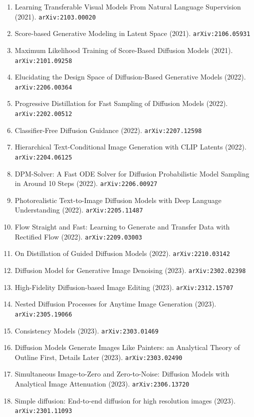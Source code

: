 \documentclass[11pt]{article}
\begin{document}
\begin{enumerate}
  Text-Guided Diffusion Models (2021). \texttt{arXiv:2112.10741}
  \item Learning Transferable Visual Models From Natural Language Supervision (2021). \texttt{arXiv:2103.00020}
  \item Score-based Generative Modeling in Latent Space (2021). \texttt{arXiv:2106.05931}
  \item Maximum Likelihood Training of Score-Based Diffusion Models (2021). \texttt{arXiv:2101.09258}
  \item Elucidating the Design Space of Diffusion-Based Generative Models (2022). \texttt{arXiv:2206.00364}
  \item Progressive Distillation for Fast Sampling of Diffusion Models (2022). \texttt{arXiv:2202.00512}
  \item Classifier-Free Diffusion Guidance (2022). \texttt{arXiv:2207.12598}
  \item Hierarchical Text-Conditional Image Generation with CLIP Latents (2022). \texttt{arXiv:2204.06125}
  \item DPM-Solver: A Fast ODE Solver for Diffusion Probabilistic Model Sampling
  in Around 10 Steps (2022). \texttt{arXiv:2206.00927}
  \item Photorealistic Text-to-Image Diffusion Models with Deep Language
  Understanding (2022). \texttt{arXiv:2205.11487}
  \item Flow Straight and Fast: Learning to Generate and Transfer Data with
  Rectified Flow (2022). \texttt{arXiv:2209.03003}
  \item On Distillation of Guided Diffusion Models (2022). \texttt{arXiv:2210.03142}
  \item Diffusion Model for Generative Image Denoising (2023). \texttt{arXiv:2302.02398}
  \item High-Fidelity Diffusion-based Image Editing (2023). \texttt{arXiv:2312.15707}
  \item Nested Diffusion Processes for Anytime Image Generation (2023). \texttt{arXiv:2305.19066}
  \item Consistency Models (2023). \texttt{arXiv:2303.01469}
  \item Diffusion Models Generate Images Like Painters: an Analytical Theory of
  Outline First, Details Later (2023). \texttt{arXiv:2303.02490}
  \item Simultaneous Image-to-Zero and Zero-to-Noise: Diffusion Models with
  Analytical Image Attenuation (2023). \texttt{arXiv:2306.13720}
  \item Simple diffusion: End-to-end diffusion for high resolution images (2023). \texttt{arXiv:2301.11093}

\end{enumerate}
\end{document}
